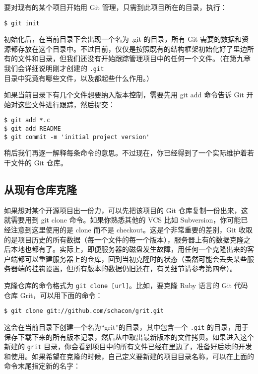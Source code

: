 \documentclass[a4paper]{book}
\begin{document}
要对现有的某个项目开始用 Git 管理，只需到此项目所在的目录，执行：

\begin{shaded}\begin{verbatim}
$ git init
\end{verbatim}\end{shaded}

初始化后，在当前目录下会出现一个名为 .git 的目录，所有 Git 需要的数据和资源都存放在这个目录中。不过目前，仅仅是按照既有的结构框架初始化好了里边所有的文件和目录，但我们还没有开始跟踪管理项目中的任何一个文件。（在第九章我们会详细说明刚才创建的 \texttt{.git} 目录中究竟有哪些文件，以及都起些什么作用。）

如果当前目录下有几个文件想要纳入版本控制，需要先用 git add 命令告诉 Git 开始对这些文件进行跟踪，然后提交：

\begin{shaded}\begin{verbatim}
$ git add *.c
$ git add README
$ git commit -m 'initial project version'
\end{verbatim}\end{shaded}

稍后我们再逐一解释每条命令的意思。不过现在，你已经得到了一个实际维护着若干文件的 Git 仓库。

\subsection{从现有仓库克隆}

如果想对某个开源项目出一份力，可以先把该项目的 Git 仓库复制一份出来，这就需要用到 git clone 命令。如果你熟悉其他的 VCS 比如 Subversion，你可能已经注意到这里使用的是 clone 而不是 checkout。这是个非常重要的差别，Git 收取的是项目历史的所有数据（每一个文件的每一个版本），服务器上有的数据克隆之后本地也都有了。实际上，即便服务器的磁盘发生故障，用任何一个克隆出来的客户端都可以重建服务器上的仓库，回到当初克隆时的状态（虽然可能会丢失某些服务器端的挂钩设置，但所有版本的数据仍旧还在，有关细节请参考第四章）。

克隆仓库的命令格式为 \texttt{git clone {[}url{]}}。比如，要克隆 Ruby 语言的 Git 代码仓库 Grit，可以用下面的命令：

\begin{shaded}\begin{verbatim}
$ git clone git://github.com/schacon/grit.git
\end{verbatim}\end{shaded}

这会在当前目录下创建一个名为“grit”的目录，其中包含一个 \texttt{.git} 的目录，用于保存下载下来的所有版本记录，然后从中取出最新版本的文件拷贝。如果进入这个新建的 \texttt{grit} 目录，你会看到项目中的所有文件已经在里边了，准备好后续的开发和使用。如果希望在克隆的时候，自己定义要新建的项目目录名称，可以在上面的命令末尾指定新的名字：
\end{document}
